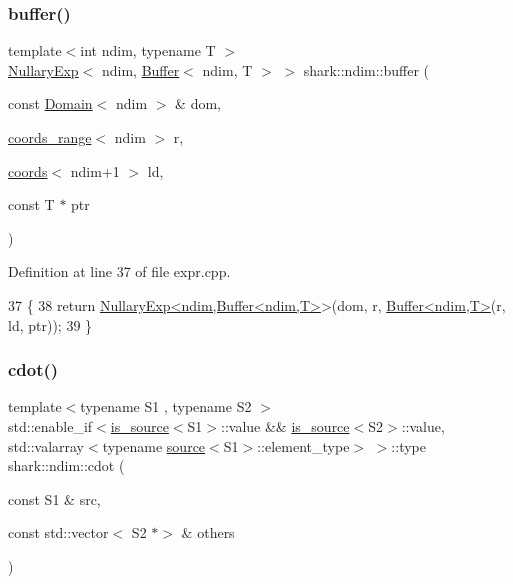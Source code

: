 \subsubsection{\texorpdfstring{buffer()}{buffer()}}
{\footnotesize\ttfamily template$<$int ndim, typename T $>$ \\
\hyperlink{classshark_1_1ndim_1_1_nullary_exp}{Nullary\+Exp}$<$ ndim, \hyperlink{classshark_1_1ndim_1_1_buffer}{Buffer}$<$ ndim, T $>$ $>$ shark\+::ndim\+::buffer (\begin{DoxyParamCaption}\item[{const \hyperlink{classshark_1_1ndim_1_1_domain}{Domain}$<$ ndim $>$ \&}]{dom,  }\item[{\hyperlink{structshark_1_1ndim_1_1coords__range}{coords\+\_\+range}$<$ ndim $>$}]{r,  }\item[{\hyperlink{structshark_1_1ndim_1_1coords}{coords}$<$ ndim+1 $>$}]{ld,  }\item[{const T $\ast$}]{ptr }\end{DoxyParamCaption})}



Definition at line 37 of file expr.\+cpp.


\begin{DoxyCode}
37                                                                                                            
                           \{
38     \textcolor{keywordflow}{return} \hyperlink{classshark_1_1ndim_1_1_nullary_exp}{NullaryExp<ndim,Buffer<ndim,T>}>(dom, r, 
      \hyperlink{classshark_1_1ndim_1_1_buffer}{Buffer<ndim,T>}(r, ld, ptr));
39 \}
\end{DoxyCode}
\hypertarget{namespaceshark_1_1ndim_af41287806ba7a4ab84540e6611a046e7}{}\label{namespaceshark_1_1ndim_af41287806ba7a4ab84540e6611a046e7} 
\subsubsection{\texorpdfstring{cdot()}{cdot()}}
{\footnotesize\ttfamily template$<$typename S1 , typename S2 $>$ \\
std\+::enable\+\_\+if$<$\hyperlink{classshark_1_1ndim_1_1is__source}{is\+\_\+source}$<$S1$>$\+::value \&\& \hyperlink{classshark_1_1ndim_1_1is__source}{is\+\_\+source}$<$S2$>$\+::value, std\+::valarray$<$typename \hyperlink{structshark_1_1ndim_1_1source}{source}$<$S1$>$\+::element\+\_\+type$>$ $>$\+::type shark\+::ndim\+::cdot (\begin{DoxyParamCaption}\item[{const S1 \&}]{src,  }\item[{const std\+::vector$<$ S2 $\ast$$>$ \&}]{others }\end{DoxyParamCaption})}



